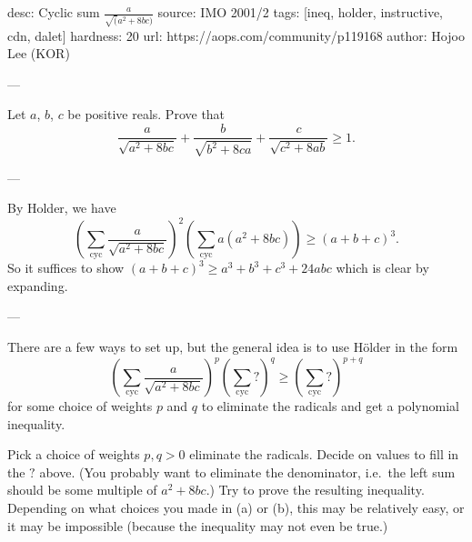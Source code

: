 desc:  Cyclic sum $\frac{a}{\sqrt(a^2+8bc)}$
source:  IMO 2001/2
tags:  [ineq, holder, instructive, cdn, dalet]
hardness: 20
url: https://aops.com/community/p119168
author: Hojoo Lee (KOR)

---

Let $a$, $b$, $c$ be positive reals. Prove that
\[ \frac{a}{\sqrt{a^2+8bc}} + \frac{b}{\sqrt{b^2+8ca}} + \frac{c}{\sqrt{c^2+8ab}} \ge 1. \]

---

By Holder, we have
\[
  \left( \sum_{\text{cyc}} \frac{a}{\sqrt{a^2+8bc}} \right)^2
  \left( \sum_{\text{cyc}} a(a^2+8bc) \right)
  \ge (a+b+c)^3.
\]
So it suffices to show $(a+b+c)^3 \ge a^3+b^3+c^3+24abc$ which is clear by expanding.

---

There are a few ways to set up, but
the general idea is to use H\"{o}lder in the form
\[
  \left( \sum_{\text{cyc}} \frac{a}{\sqrt{a^2+8bc}} \right)^p
  \left( \sum_{\text{cyc}} {?}  \right)^q
  \ge \left( \sum_{\text{cyc}} {?} \right)^{p+q}
\]
for some choice of weights $p$ and $q$ to eliminate the radicals
and get a polynomial inequality.
\begin{walk}
  \ii Pick a choice of weights $p, q > 0$ eliminate the radicals.
  \ii Decide on values to fill in the $?$ above.
  (You probably want to eliminate the denominator,
  i.e.\ the left sum should be some multiple of $a^2+8bc$.)
  \ii Try to prove the resulting inequality.
  Depending on what choices you made in (a) or (b),
  this may be relatively easy,
  or it may be impossible (because the inequality may not even be true.)
\end{walk}
